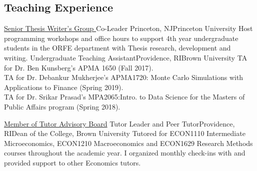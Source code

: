 \documentclass[10pt,a4paper,roman]{moderncv}        %
\begin{document}
\subsection{Teaching Experience}
{\color{blue}\href{https://orfe.princeton.edu/undergraduate/stwg}{Senior Thesis
    Writer's Group }\color{black} Co-Leader}
{Princeton, NJ}{Princeton University}
{Host programming workshops and office hours to support
  4th year undergraduate students in the ORFE department with Thesis research, development and writing.}
{Undergraduate Teaching Assistant}{Providence, RI}{Brown University}
{TA for Dr. Ben Kunsberg's APMA 1650 (Fall 2017).\\
TA for Dr. Debankur Mukherjee's APMA1720: Monte Carlo Simulations with Applications to Finance (Spring 2019). \\
TA for Dr. Srikar Prasad's MPA2065:Intro. to Data Science for the Masters of Public Affairs program (Spring 2018).}

{\color{blue}\href{https://www.brown.edu/sheridan/programs-services/tutoring/staff}{Member
    of Tutor Advisory Board}\color{black}}
{Tutor Leader and Peer Tutor}{Providence, RI}{Dean of the College, Brown
  University}
{Tutored for ECON1110 Intermediate Microeconomics,
  ECON1210 Macroeconomics
  and ECON1629 Research Methods courses throughout the academic year.
  I organized monthly check-ins with and provided support to other Economics tutors.}
\end{document}
